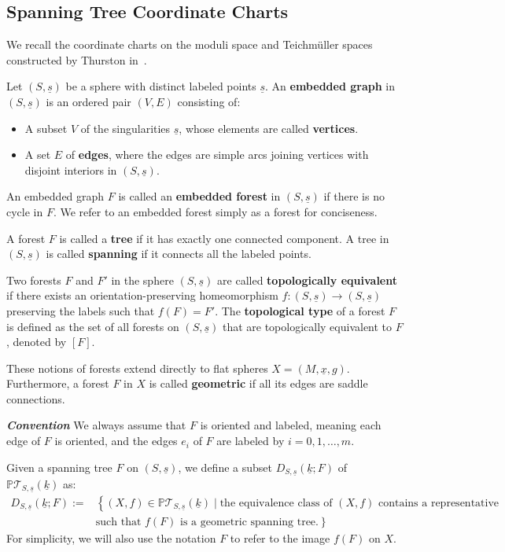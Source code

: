 \documentclass{compositio}
\numberwithin{equation}{section}
\numberwithin{figure}{section}
\theoremstyle{definition}
\theoremstyle{plain}
\begin{document}
{\subsection{Spanning Tree Coordinate Charts}\label{sec:spanningtree}
We recall the coordinate charts on the moduli space and Teichm\"uller spaces constructed by Thurston in~\cite{thu}.

Let $(S, \underline{s})$ be a sphere with distinct labeled points $\underline{s}$. An \textbf{embedded graph} in $(S, \underline{s})$ is an ordered pair $(V,E)$ consisting of:
\begin{itemize}
    \item A subset $V$ of the singularities $\underline{s}$, whose elements are called \textbf{vertices}.
    \item A set $E$ of \textbf{edges}, where the edges are simple arcs joining vertices with disjoint interiors in $(S, \underline{s})$.
\end{itemize}
An embedded graph $F$ is called an \textbf{embedded forest} in $(S, \underline{s})$ if there is no cycle in $F$. We refer to an embedded forest simply as a forest for conciseness.

A forest $F$ is called a \textbf{tree} if it has exactly one connected component. A tree in $(S, \underline{s})$ is called \textbf{spanning} if it connects all the labeled points.

Two forests $F$ and $F'$ in the sphere $(S, \underline{s})$ are called \textbf{topologically equivalent} if there exists an orientation-preserving homeomorphism $f: (S, \underline{s}) \to (S, \underline{s})$ preserving the labels such that $f(F) = F'$. The \textbf{topological type} of a forest $F$ is defined as the set of all forests on $(S, \underline{s})$ that are topologically equivalent to $F$, denoted by $[F]$.

These notions of forests extend directly to flat spheres $X = (M, \underline{x}, g)$. Furthermore, a forest $F$ in $X$ is called \textbf{geometric} if all its edges are saddle connections.

\smallskip

\noindent\textit{\textbf{Convention}} We always assume that $F$ is oriented and labeled, meaning each edge of $F$ is oriented, and the edges $e_i$ of $F$ are labeled by $i = 0, 1,\ldots, m$.

\smallskip

Given a spanning tree $F$ on $(S, \underline{s})$, we define a subset $D_{S,\underline{s}}(\underline{k};F)$ of $\mathbb{P}\mathcal{T}_{S,\underline{s}}(\underline{k})$ as:
\begin{align*}
    D_{S,\underline{s}}(\underline{k};F) := &\left\{ (X,f)\in \mathbb{P}\mathcal{T}_{S,\underline{s}}(\underline{k}) \mid \text{the equivalence class of } (X,f) \text{ contains a representative} \right.\\
    & \left. \text{such that } f(F)\text{ is a geometric spanning tree.}  \right\}
\end{align*}
For simplicity, we will also use the notation $F$ to refer to the image $f(F)$ on $X$.

}
\end{document}
